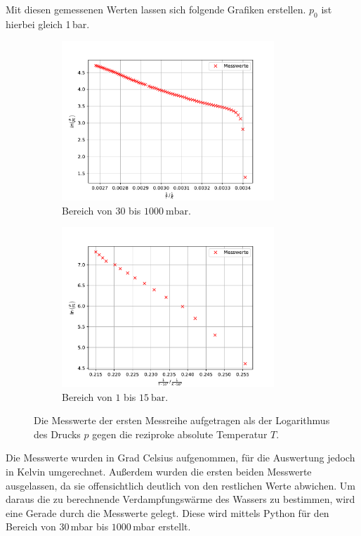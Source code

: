 Mit diesen gemessenen Werten lassen sich folgende Grafiken erstellen. $p_0$ ist hierbei gleich 1\,bar.
\begin{figure}[H]
  \begin{subfigure}{0.48\textwidth}
      \includegraphics[height=6cm]{plota.pdf}  
    \caption{Bereich von $30$ bis $\SI{1000}{\milli\bar}$.}
    \label{fig:MesswerteKlein}
  \end{subfigure}
  \hfill
  \begin{subfigure}{0.48\textwidth}
    \includegraphics[height=6cm]{plotb.pdf}
    \caption{Bereich von $1$ bis $\SI{15}{\bar}$.}
    \label{fig:MesswerteGross}
  \end{subfigure}
  \caption{Die Messwerte der ersten Messreihe aufgetragen als der Logarithmus des Drucks $p$
  gegen die reziproke absolute Temperatur $T$.}
  \label{fig:Teila}
\end{figure}
\noindent
Die Messwerte wurden in Grad Celsius aufgenommen, für die Auswertung jedoch in Kelvin umgerechnet. Außerdem wurden die ersten beiden Messwerte ausgelassen,
da sie offensichtlich deutlich von den restlichen Werte abwichen.
Um daraus die zu berechnende Verdampfungswärme des Wassers zu bestimmen, wird eine Gerade durch die Messwerte gelegt.
Diese wird mittels Python für den Bereich von $30$\,mbar bis $1000$\,mbar erstellt. \\
